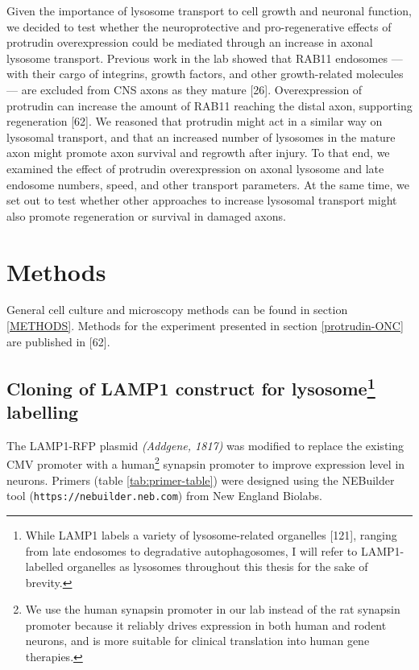 \documentclass[
  12pt,
  a4paper,
]{book}
\begin{document}
Given the importance of lysosome transport to cell growth and neuronal function, we decided to test whether the neuroprotective and pro-regenerative effects of protrudin overexpression could be mediated through an increase in axonal lysosome transport. Previous work in the lab showed that RAB11 endosomes --- with their cargo of integrins, growth factors, and other growth-related molecules --- are excluded from CNS axons as they mature {[}26{]}. Overexpression of protrudin can increase the amount of RAB11 reaching the distal axon, supporting regeneration {[}62{]}. We reasoned that protrudin might act in a similar way on lysosomal transport, and that an increased number of lysosomes in the mature axon might promote axon survival and regrowth after injury. To that end, we examined the effect of protrudin overexpression on axonal lysosome and late endosome numbers, speed, and other transport parameters. At the same time, we set out to test whether other approaches to increase lysosomal transport might also promote regeneration or survival in damaged axons.

\section{Methods}\label{methods}

General cell culture and microscopy methods can be found in section \ref{METHODS}. Methods for the experiment presented in section \ref{protrudin-ONC} are published in {[}62{]}.

\subsection[Cloning of LAMP1 construct for lysosome labelling]{\texorpdfstring{Cloning of LAMP1 construct for lysosome\footnote{While LAMP1 labels a variety of lysosome-related organelles {[}121{]}, ranging from late endosomes to degradative autophagosomes, I will refer to LAMP1-labelled organelles as lysosomes throughout this thesis for the sake of brevity.} labelling}{Cloning of LAMP1 construct for lysosome labelling}}\label{cloning}

The LAMP1-RFP plasmid \emph{(Addgene, 1817)} was modified to replace the existing CMV promoter with a human\footnote{We use the human synapsin promoter in our lab instead of the rat synapsin promoter because it reliably drives expression in both human and rodent neurons, and is more suitable for clinical translation into human gene therapies.} synapsin promoter to improve expression level in neurons. Primers (table \ref{tab:primer-table}) were designed using the NEBuilder tool (\texttt{https://nebuilder.neb.com}) from New England Biolabs.
\end{document}
